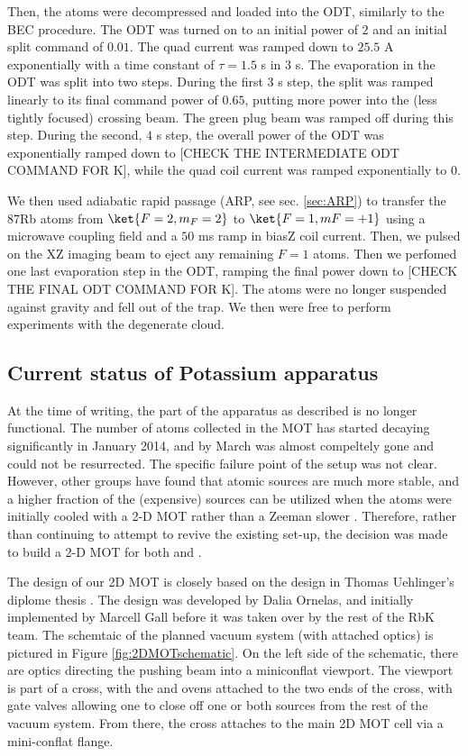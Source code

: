 Then, the atoms were decompressed and loaded into the ODT, similarly to the BEC procedure. The ODT was turned on to an initial power of $2$ and an initial split command of $0.01$. The quad current was ramped down to $25.5$ A exponentially with a time constant of $\tau=1.5$ s in $3$ s. The evaporation in the ODT was split into two steps. During the first $3$ s step, the split was ramped linearly to its final command power of $0.65$, putting more power into the (less tightly focused) crossing beam. The green plug beam was ramped off during this step. During the second, $4$ s step, the overall power of the ODT was exponentially ramped down to [CHECK THE INTERMEDIATE ODT COMMAND FOR K], while the quad coil current was ramped exponentially to $0$.


We then used adiabatic rapid passage (ARP, see sec. \ref{sec:ARP}) to transfer the 87Rb atoms from $\ket{F = 2,m_F = 2}$ to $\ket{F = 1,mF = +1}$ using a microwave coupling field and a $50$ ms ramp in biasZ coil current. Then, we pulsed on the XZ imaging beam to eject any remaining $F=1$ atoms. Then we perfomed one last evaporation step in the ODT, ramping the final power down to [CHECK THE FINAL ODT COMMAND FOR K]. The \Rb{} atoms were no longer suspended against gravity and fell out of the trap. We then were free to perform experiments with the degenerate \K{} cloud. 

\subsection{Current status of Potassium apparatus}

At the time of writing, the \K{} part of the apparatus as described is no longer functional. The number of \K{} atoms collected in the MOT has started decaying significantly in January 2014, and by March was almost compeltely gone and could not be resurrected. The specific failure point of the setup was not clear. However, other groups have found that atomic sources are much more stable, and a higher fraction of the (expensive) \K{} sources can be utilized when the atoms were initially cooled with a 2-D MOT rather than a Zeeman slower \cite{Catani2006,UehlingerThesis,Pedrozo2016}. Therefore, rather than continuing to attempt to revive the existing set-up, the decision was made to build a 2-D MOT for both \K{} and \Rb{}.

The design of our 2D MOT is closely based on the design in Thomas Uehlinger's diplome thesis \cite{UehlingerThesis}. The design was developed by Dalia Ornelas, and initially implemented by Marcell Gall before it was taken over by the rest of the RbK team. The schemtaic of the planned vacuum system (with attached optics) is pictured in Figure \ref{fig:2DMOTschematic}. On the left side of the schematic, there are optics directing the pushing beam into a miniconflat viewport. The viewport is part of a cross, with the \K{} and \Rb{} ovens attached to the two ends of the cross, with gate valves allowing one to close off one or both sources from the rest of the vacuum system. From there, the cross attaches to the main 2D MOT cell via a mini-conflat flange. 

